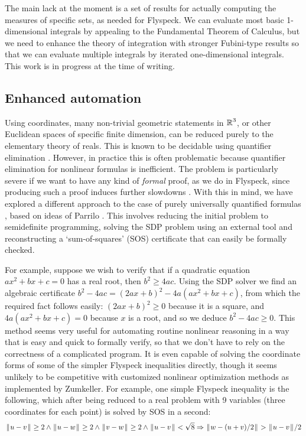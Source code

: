 \documentclass[11pt]{amsart}
\def\|{{\hskip0.1em|\hskip-0.1em|\hskip0.1em}}
\newcommand{\real}{\mbox{$\protect\mathbb R$}}
\let\And=\wedge                    %
\newcommand{\Imp}{\Rightarrow}
\begin{document}
The main lack at the moment is a set of results for actually computing the
measures of specific sets, as needed for Flyspeck. We can evaluate most basic
1-dimensional integrals by appealing to the Fundamental Theorem of Calculus,
but we need to enhance the theory of integration with stronger Fubini-type
results so that we can evaluate multiple integrals by iterated one-dimensional
integrals. This work is in progress at the time of writing.

\subsection*{Enhanced automation}

Using coordinates, many non-trivial geometric statements in $\real^3$, or other
Euclidean spaces of specific finite dimension, can be reduced purely to the
elementary theory of reals. This is known to be decidable using quantifier
elimination \cite{tarski-decision,collins,hormander-pdo2}. However, in practice
this is often problematic because quantifier elimination for nonlinear formulas
is inefficient. The problem is particularly severe if we want to have any kind
of {\em formal} proof, as we do in Flyspeck, since producing such a proof
induces further slowdowns \cite{mahboubi-hormander,mclaughlin-harrison}. With
this in mind, we have explored a different approach to the case of purely
universally quantified formulas \cite{harrison-sos}, based on ideas of Parrilo
\cite{parrilo-semidefinite}. This involves reducing the initial problem to
semidefinite programming, solving the SDP problem using an external tool and
reconstructing a `sum-of-squares' (SOS) certificate that can easily be formally
checked.

For example, suppose we wish to verify that if a quadratic equation $a x^2 + b
x + c = 0$ has a real root, then $b^2 \geq 4 a c$. Using the SDP solver we find
an algebraic certificate $b^2 - 4 a c = (2 a x + b)^2 - 4 a (a x^2 + b x + c)$,
from which the required fact follows easily: $(2 a x + b)^2 \geq 0$ because it
is a square, and $4 a (a x^2 + b x + c) = 0$ because $x$ is a root, and so we
deduce $b^2 - 4 a c \geq 0$. This method seems very useful for automating
routine nonlinear reasoning in a way that is easy and quick to formally verify,
so that we don't have to rely on the correctness of a complicated program. It
is even capable of solving the coordinate forms of some of the simpler Flyspeck
inequalities directly, though it seems unlikely to be competitive with
customized nonlinear optimization methods as implemented by Zumkeller. For
example, one simple Flyspeck inequality is the following, which after being
reduced to a real problem with 9 variables (three coordinates for each point)
is solved by SOS in a second:
$$ \|u - v\| \geq 2 \And \|u - w\| \geq 2 \And \|v - w\| \geq 2 \And
   \|u - v\| < \sqrt{8}
   \Imp \|w - (u + v)/2\| > \|u - v\|/2
$$
\end{document}
